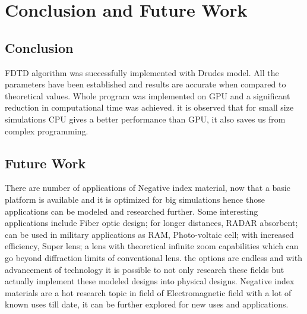 
\section{Conclusion and Future Work}


\subsection{Conclusion }
FDTD algorithm was successfully implemented with Drudes model. All the parameters have been established and results are accurate when compared to theoretical values. Whole program was implemented on GPU and a significant reduction in computational time was achieved. it is observed that for small size simulations CPU gives a better performance than GPU, it also saves us from complex programming.


\subsection{Future Work }

There are number of applications of Negative index material, now that a basic platform is available and it is optimized for big simulations hence those applications can be modeled and researched further. Some interesting applications include Fiber optic design; for longer distances, RADAR absorbent; can be used in military applications as RAM, Photo-voltaic cell; with increased efficiency, Super lens; a lens with theoretical infinite zoom capabilities which can go beyond diffraction limits of conventional lens. the options are endless and with advancement of technology it is possible to not only research these fields but actually implement these modeled designs into physical designs. Negative index materials are a hot research topic in field of Electromagnetic field with a lot of known uses till date, it can be further explored for new uses and applications.

